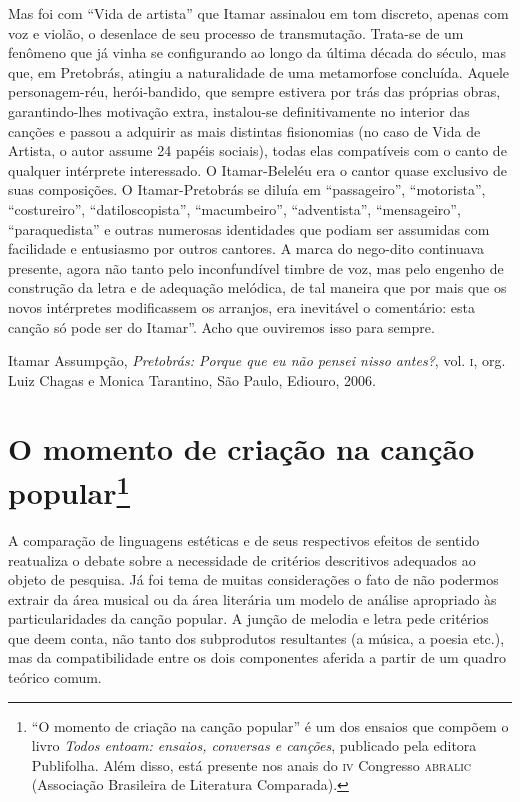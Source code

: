 Mas foi com ``Vida de artista'' que Itamar assinalou em tom discreto, apenas
com voz e violão, o desenlace de seu processo de transmutação. Trata-se
de um fenômeno que já vinha se configurando ao longo da última década do
século, mas que, em Pretobrás, atingiu a naturalidade de uma metamorfose
concluída. Aquele personagem-réu, herói-bandido, que sempre estivera por
trás das próprias obras, garantindo-lhes motivação extra, instalou-se
definitivamente no interior das canções e passou a adquirir as mais
distintas fisionomias (no caso de Vida de Artista, o autor assume 24
papéis sociais), todas elas compatíveis com o canto de qualquer
intérprete interessado. O Itamar-Beleléu era o cantor quase exclusivo
de suas composições. O Itamar-Pretobrás se diluía em ``passageiro'',
``motorista'', ``costureiro'', ``datiloscopista'', ``macumbeiro'',
``adventista'', ``mensageiro'', ``paraquedista'' e outras numerosas
identidades que podiam ser assumidas com facilidade e entusiasmo por
outros cantores. A marca do nego-dito continuava presente, agora não
tanto pelo inconfundível timbre de voz, mas pelo engenho de construção
da letra e de adequação melódica, de tal maneira que por mais que os
novos intérpretes modificassem os arranjos, era inevitável o comentário:
esta canção só pode ser do Itamar''. Acho que ouviremos isso para
sempre.

Itamar Assumpção, \textit{Pretobrás: Porque que eu não pensei nisso antes?}, vol.
\textsc{i}, org. Luiz Chagas e Monica Tarantino, São Paulo, Ediouro, 2006.

\chapter{O momento de criação na canção popular\footnote{``O momento de criação na canção popular'' é um dos ensaios que compõem o livro \textit{Todos entoam: ensaios, conversas e canções}, publicado pela editora Publifolha. 
Além disso, está presente nos anais do \textsc{iv} Congresso \textsc{abralic} (Associação Brasileira de Literatura Comparada).}}



A comparação de linguagens estéticas e de seus respectivos efeitos de
sentido reatualiza o debate sobre a necessidade de critérios descritivos
adequados ao objeto de pesquisa. Já foi tema de muitas considerações o
fato de não podermos extrair da área musical ou da área literária um
modelo de análise apropriado às particularidades da canção popular. A
junção de melodia e letra pede critérios que deem conta, não tanto dos
subprodutos resultantes (a música, a poesia etc.), mas da
compatibilidade entre os dois componentes aferida a partir de um quadro
teórico comum.

